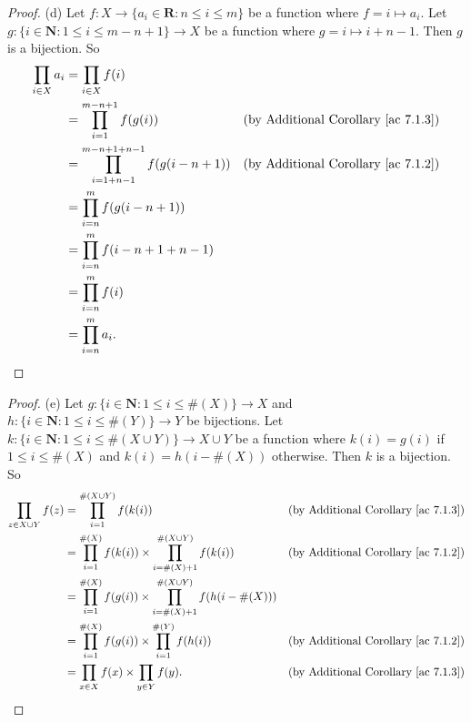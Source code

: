 \begin{proof}{(d)}
    Let \(f : X \to \{a_i \in \mathbf{R} : n \leq i \leq m\}\) be a function where \(f = i \mapsto a_i\).
    Let \(g : \{i \in \mathbf{N} : 1 \leq i \leq m - n + 1\} \to X\) be a function where \(g = i \mapsto i + n - 1\).
    Then \(g\) is a bijection.
    So
    \begin{align*}
        \prod_{i \in X} a_i & = \prod_{i \in X} f(i)                                                                                        \\
                            & = \prod_{i = 1}^{m - n + 1} f(g(i))                         & \text{(by Additional Corollary \ref{ac 7.1.3})} \\
                            & = \prod_{i = 1 + n - 1}^{m - n + 1 + n - 1} f(g(i - n + 1)) & \text{(by Additional Corollary \ref{ac 7.1.2})} \\
                            & = \prod_{i = n}^m f(g(i - n + 1))                                                                             \\
                            & = \prod_{i = n}^m f(i - n + 1 + n - 1)                                                                        \\
                            & = \prod_{i = n}^m f(i)                                                                                        \\
                            & = \prod_{i = n}^m a_i.
    \end{align*}
\end{proof}

\begin{proof}{(e)}
    Let \(g : \{i \in \mathbf{N} : 1 \leq i \leq \#(X)\} \to X\) and \(h : \{i \in \mathbf{N} : 1 \leq i \leq \#(Y)\} \to Y\) be bijections.
    Let \(k : \{i \in \mathbf{N} : 1 \leq i \leq \#(X \cup Y)\} \to X \cup Y\) be a function where \(k(i) = g(i)\) if \(1 \leq i \leq \#(X)\) and \(k(i) = h(i - \#(X))\) otherwise.
    Then \(k\) is a bijection.
    So
    \begin{align*}
        \prod_{z \in X \cup Y} f(z) & = \prod_{i = 1}^{\#(X \cup Y)} f(k(i))                                                      & \text{(by Additional Corollary \ref{ac 7.1.3})} \\
                                    & = \prod_{i = 1}^{\#(X)} f(k(i)) \times \prod_{i = \#(X) + 1}^{\#(X \cup Y)} f(k(i))         & \text{(by Additional Corollary \ref{ac 7.1.2})} \\
                                    & = \prod_{i = 1}^{\#(X)} f(g(i)) \times \prod_{i = \#(X) + 1}^{\#(X \cup Y)} f(h(i - \#(X)))                                                   \\
                                    & = \prod_{i = 1}^{\#(X)} f(g(i)) \times \prod_{i = 1}^{\#(Y)} f(h(i))                        & \text{(by Additional Corollary \ref{ac 7.1.2})} \\
                                    & = \prod_{x \in X} f(x) \times \prod_{y \in Y} f(y).                                         & \text{(by Additional Corollary \ref{ac 7.1.3})}
    \end{align*}
\end{proof}

